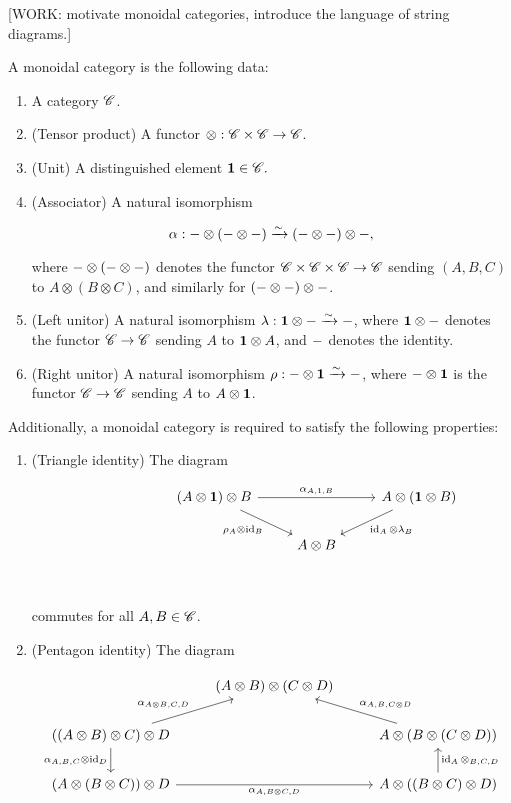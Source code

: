 [WORK: motivate monoidal categories, introduce the language of string diagrams.]


\begin{definition} A monoidal category is the following data:

\begin{enumerate}
\item A category $\mathscr{C}$.
\item (Tensor product) A functor $\otimes: \mathscr{C} \times \mathscr{C} \to \mathscr{C}$.
\item (Unit) A distinguished element $\mathbf{1}\in \mathscr{C}.$
\item (Associator) A natural isomorphism

$$\alpha: \--\otimes (\-- \otimes \--) \xrightarrow{\sim} (\--\otimes \--)\otimes \-- , $$

where $\-- \otimes (\--\otimes \--)$ denotes the functor $\mathscr{C}\times \mathscr{C}\times \mathscr{C}\to\mathscr{C}$ sending $(A,B,C)$ to $A\otimes (B\otimes C)$, and similarly for $(\-- \otimes \-- )\otimes\--$.
\item (Left unitor) A natural isomorphism $\lambda: \mathbf{1}\otimes \-- \xrightarrow{\sim} \--$, where $\mathbf{1}\otimes \--$ denotes the functor $\mathscr{C}\to \mathscr{C}$ sending $A$ to $\mathbf{1}\otimes A$, and $\--$ denotes the identity.
\item (Right unitor) A natural isomorphism $\rho: \--\otimes \mathbf{1} \xrightarrow{\sim} \--$, where $\--\otimes \mathbf{1}$ is the functor $\mathscr{C}\to \mathscr{C}$ sending $A$ to $A\otimes \mathbf{1}$.
\end{enumerate}

Additionally, a monoidal category is required to satisfy the following properties:

\begin{enumerate}
\item (Triangle identity) The diagram

\[\begin{tikzcd}
	{} & {} & {\left(A\otimes \one\right)\otimes B} & {} & {A\otimes (\one\otimes B)} \\
	&& {} & {A\otimes B} \\
	&&&& {}
	\arrow["{\alpha_{A,1,B}}", from=1-3, to=1-5]
	\arrow["{\rho_A\otimes \id_B}"', from=1-3, to=2-4]
	\arrow["{\id_A\otimes \lambda_B}", from=1-5, to=2-4]
\end{tikzcd}\]

commutes for all $A,B\in \mathscr{C}$.

\item (Pentagon identity) The diagram

\[\begin{tikzcd}
	& {(A\otimes B)\otimes(C\otimes D)} \\
	{((A\otimes B)\otimes C)\otimes D} && {A\otimes (B\otimes (C\otimes D))} \\
	{(A\otimes (B\otimes C))\otimes D} && {A\otimes((B\otimes C)\otimes D)}
	\arrow["{\alpha_{A\otimes B, C,D}}", from=2-1, to=1-2]
	\arrow["{\alpha_{A,B,{C\otimes D}}}"', from=2-3, to=1-2]
	\arrow["{\alpha_{A,B,C}\otimes \id_D}"', from=2-1, to=3-1]
	\arrow["{\id_A\otimes_{B,C,D}}"', from=3-3, to=2-3]
	\arrow["{\alpha_{A,B\otimes C,D}}"', from=3-1, to=3-3]
\end{tikzcd}\]


\end{enumerate}
\end{definition}
